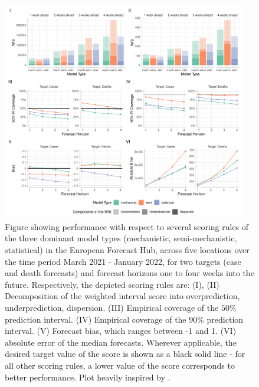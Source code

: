 \begin{figure}
\centering
\includegraphics[width = 0.95\textwidth]{../plots/overall_assessment_model_types.pdf}
\caption{Figure showing performance with respect to several scoring rules of the three dominant model types (mechanistic, semi-mechanistic, statistical) in the European Forecast Hub, across five locations over the time period March 2021 - January 2022, for two targets (case and death forecasts) and forecast horizons one to four weeks into the future. Respectively, the depicted scoring rules are: (I), (II) Decomposition of the weighted interval score into overprediction, underprediction, dispersion. (III) Empirical coverage of the $50\%$ prediction interval. (IV) Empirical coverage of the $90\%$ prediction interval. (V) Forecast bias, which ranges between -1 and 1. (VI) absolute error of the median forecasts. Wherever applicable, the desired target value of the score is shown as a black solid line - for all other scoring rules, a lower value of the score corresponds to better performance. Plot heavily inspired by \cite{bosse_comparing_2021-1}. }
\label{fig:decomp_model_types}
\end{figure}
